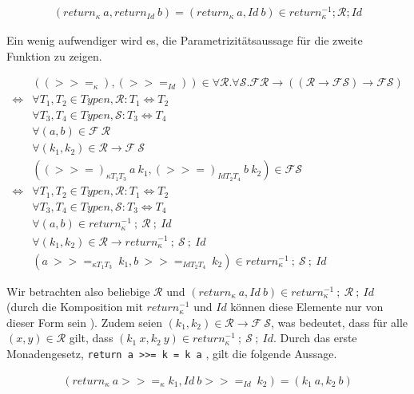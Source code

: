 \begin{align*}
(return_{\kappa}\ a, return_{Id}\ b) = (return_{\kappa}\ a, Id\ b) \in return_{\kappa}^{-1} ; \mathcal{R} ; Id
\end{align*}

Ein wenig aufwendiger wird es, die Parametrizitätsaussage für die zweite Funktion zu zeigen.

\begin{align*}
& ((>>=_{\kappa}), (>>=_{Id})) \in \forall \mathcal{R}. \forall \mathcal{S}. \mathcal{F} \mathcal{R} \rightarrow
((\mathcal{R} \rightarrow \mathcal{F} \mathcal{S}) \rightarrow \mathcal{F} \mathcal{S}) \\
\Leftrightarrow & \forall T_1, T_2 \in Typen, \mathcal{R} : T_1 \Leftrightarrow T_2 \\
& \forall T_3, T_4 \in Typen, \mathcal{S} : T_3 \Leftrightarrow T_4 \\
& \forall (a, b) \in \mathcal{F}\ \mathcal{R} \\
& \forall (k_1, k_2) \in \mathcal{R} \rightarrow \mathcal{F}\ \mathcal{S}\\
& ((>>=)_{\kappa T_1 T_3}\ a\ k_1, (>>=)_{Id T_2 T_4}\ b\ k_2) \in \mathcal{F} \mathcal{S}\\
\Leftrightarrow & \forall T_1, T_2 \in Typen, \mathcal{R} : T_1 \Leftrightarrow T_2 \\
& \forall T_3, T_4 \in Typen, \mathcal{S} : T_3 \Leftrightarrow T_4 \\
& \forall (a, b) \in return_{\kappa}^{-1}~;~\mathcal{R}~;~Id \\
& \forall (k_1, k_2) \in \mathcal{R} \rightarrow return_{\kappa}^{-1}~;~\mathcal{S}~;~Id\\
& (a\ >>=_{\kappa T_1 T_3}\ k_1, b\ >>=_{Id T_2 T_4}\ k_2) \in return_{\kappa}^{-1}~;~\mathcal{S}~;~Id
\end{align*}

Wir betrachten also beliebige $\mathcal{R}$ und $(return_{\kappa}\ a, Id\ b) \in return_{\kappa}^{-1}~;~\mathcal{R}~;~Id$
(durch die Komposition mit $return_{\kappa}^{-1}$ und $Id$ können diese Elemente nur von dieser Form sein ).
Zudem seien $(k_1, k_2) \in \mathcal{R} \rightarrow \mathcal{F}\ \mathcal{S}$, was bedeutet, dass für alle $(x, y) \in \mathcal{R}$
gilt, dass $(k_1\ x, k_2\ y) \in return_{\kappa}^{-1}~;~\mathcal{S}~;~Id$.
Durch das erste Monadengesetz, \texttt{return a >>= k = k a} , gilt die folgende Aussage.

\begin{align*}
(return_{\kappa}\ a >>=_{\kappa} k_1, Id\ b >>=_{Id}\ k_2) = (k_1\ a, k_2\ b)
\end{align*}

